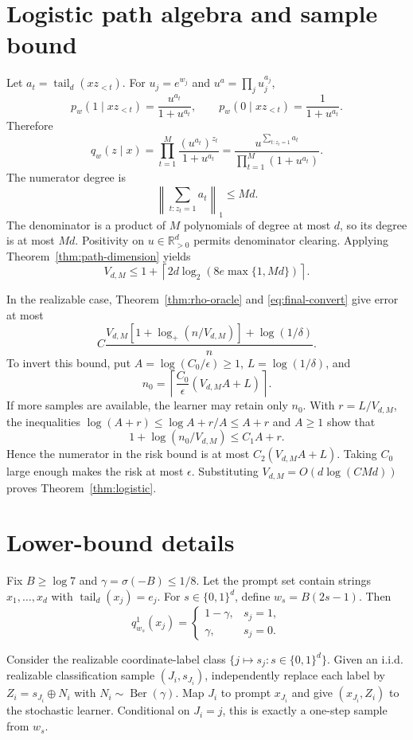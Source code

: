 \documentclass{article}
\theoremstyle{definition}
\theoremstyle{remark}
\newcommand{\tail}{\operatorname{tail}}
\newcommand{\Ber}{\operatorname{Ber}}
\begin{document}
\section{Logistic path algebra and sample bound}
\label{app:logistic}

Let $a_t=\tail_d(xz_{<t})$. For $u_j=e^{w_j}$ and $u^a=\prod_j u_j^{a_j}$, \[ p_w(1\mid xz_{<t})=\frac{u^{a_t}}{1+u^{a_t}}, \qquad p_w(0\mid xz_{<t})=\frac{1}{1+u^{a_t}}. \] Therefore \[ q_w(z\mid x)=\prod_{t=1}^M\frac{(u^{a_t})^{z_t}}{1+u^{a_t}} =\frac{u^{\sum_{t:z_t=1}a_t}}{\prod_{t=1}^M(1+u^{a_t})}. \] The numerator degree is \[ \left\|\sum_{t:z_t=1}a_t\right\|_1\le Md. \] The denominator is a product of $M$ polynomials of degree at most $d$, so its degree is at most $Md$. Positivity on $u\in\mathbb R_{>0}^d$ permits denominator clearing. Applying Theorem~\ref{thm:path-dimension} yields \[ V_{d,M}\le1+\left\lceil2d\log_2(8e\max\{1,Md\})\right\rceil. \]

In the realizable case, Theorem~\ref{thm:rho-oracle} and \eqref{eq:final-convert} give error at most \[ C\frac{V_{d,M}[1+\log_+(n/V_{d,M})]+\log(1/\delta)}{n}. \] To invert this bound, put $A=\log(C_0/\epsilon)\ge1$, $L=\log(1/\delta)$, and \[ n_0=\left\lceil\frac{C_0}{\epsilon}(V_{d,M}A+L)\right\rceil. \] If more samples are available, the learner may retain only $n_0$. With $r=L/V_{d,M}$, the inequalities $\log(A+r)\le\log A+r/A\le A+r$ and $A\ge1$ show that \[ 1+\log(n_0/V_{d,M})\le C_1A+r. \] Hence the numerator in the risk bound is at most $C_2(V_{d,M}A+L)$. Taking $C_0$ large enough makes the risk at most $\epsilon$. Substituting $V_{d,M}=O(d\log(CMd))$ proves Theorem~\ref{thm:logistic}.

\section{Lower-bound details}
\label{app:lower}

Fix $B\ge\log 7$ and $\gamma=\sigma(-B)\le1/8$. Let the prompt set contain strings $x_1,\ldots,x_d$ with $\tail_d(x_j)=e_j$. For $s\in\{0,1\}^d$, define $w_s=B(2s-1)$. Then \[
q_{w_s}^1(x_j)=\begin{cases}1-\gamma,&s_j=1,\\ \gamma,&s_j=0.\end{cases}
\]

Consider the realizable coordinate-label class $\{j\mapsto s_j:s\in\{0,1\}^d\}$. Given an i.i.d. realizable classification sample $(J_i,s_{J_i})$, independently replace each label by $Z_i=s_{J_i}\oplus N_i$ with $N_i\sim\Ber(\gamma)$. Map $J_i$ to prompt $x_{J_i}$ and give $(x_{J_i},Z_i)$ to the stochastic learner. Conditional on $J_i=j$, this is exactly a one-step sample from $w_s$.
\end{document}
